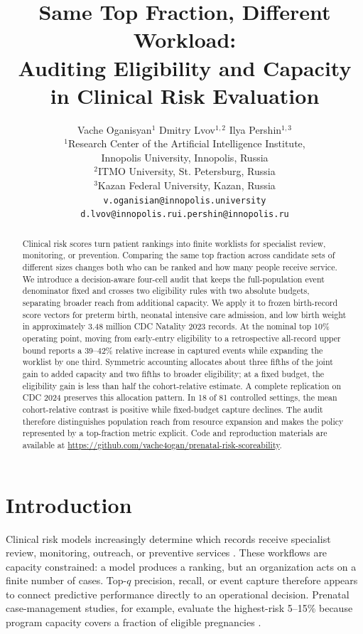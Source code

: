 \documentclass{article}
\title{Same Top Fraction, Different Workload:\\
Auditing Eligibility and Capacity in Clinical Risk Evaluation}
\author{%
  Vache Oganisyan$^{1}$ \qquad Dmitry Lvov$^{1,2}$ \qquad Ilya Pershin$^{1,3}$ \\
  $^{1}$Research Center of the Artificial Intelligence Institute, \\
  Innopolis University, Innopolis, Russia \\
  $^{2}$ITMO University, St. Petersburg, Russia \\
  $^{3}$Kazan Federal University, Kazan, Russia \\
  {\small\texttt{v.oganisian@innopolis.university}\quad
  \texttt{d.lvov@innopolis.ru}\quad\texttt{i.pershin@innopolis.ru}}
}
\begin{document}
\maketitle

\begin{abstract}
Clinical risk scores turn patient rankings into finite worklists for specialist
review, monitoring, or prevention. Comparing the same top fraction across
candidate sets of different sizes changes both
who can be ranked and how many people receive service. We introduce a
decision-aware four-cell audit that keeps the full-population event denominator
fixed and crosses two eligibility rules with two absolute budgets, separating
broader reach from additional capacity. We apply it to frozen birth-record
score vectors for preterm birth, neonatal intensive care admission, and low
birth weight in approximately 3.48 million CDC Natality 2023 records. At the
nominal top 10\% operating point, moving from early-entry eligibility to a
retrospective all-record upper bound reports a 39--42\% relative increase in
captured events while expanding the worklist by one third. Symmetric accounting
allocates about three fifths of the joint gain to added capacity and two fifths
to broader eligibility; at a fixed budget, the eligibility gain is less than
half the cohort-relative estimate. A complete replication on CDC 2024
preserves this allocation pattern. In 18 of 81 controlled settings, the mean
cohort-relative contrast is positive while fixed-budget capture declines. The
audit therefore distinguishes population reach from resource expansion and
makes the policy represented by a top-fraction metric explicit.
Code and reproduction materials are available at
\url{https://github.com/vache4ogan/prenatal-risk-scoreability}.
\end{abstract}

\section{Introduction}
\label{sec:introduction}

Clinical risk models increasingly determine which records receive specialist
review, monitoring, outreach, or preventive services
\citep{annarumma2019triage,baltruschat2021worklist,jung2021framework,singh2023resource}.
These workflows are capacity constrained: a model produces a ranking, but an
organization acts on a finite number of cases. Top-$q$ precision, recall, or
event capture therefore appears to connect predictive performance directly to
an operational decision. Prenatal case-management studies, for example,
evaluate the highest-risk 5--15\% because program capacity covers a fraction of
eligible pregnancies \citep{pan2017prenatal}.
\end{document}
